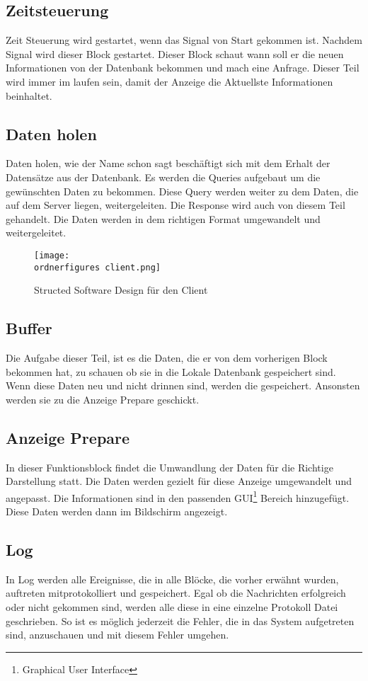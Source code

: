 \subsection{Zeitsteuerung}
Zeit Steuerung wird gestartet, wenn das Signal von Start gekommen ist. Nachdem Signal wird dieser Block gestartet. Dieser Block schaut wann soll er die neuen Informationen von der Datenbank bekommen und mach eine Anfrage. Dieser Teil wird immer im laufen sein, damit der Anzeige die Aktuellste Informationen beinhaltet.

\subsection{Daten holen}
Daten holen, wie der Name schon sagt beschäftigt sich mit dem Erhalt der Datensätze aus der Datenbank. Es werden die Queries aufgebaut um die gewünschten Daten zu bekommen. Diese Query werden weiter zu dem Daten, die auf dem Server liegen, weitergeleiten. Die Response wird auch von diesem Teil gehandelt. Die Daten werden in dem richtigen Format umgewandelt und weitergeleitet.

\begin{figure}[H]
	\centering
	\texttt{[image: \\ordnerfigures client.png]}
	\caption{Structed Software Design für den Client}
	\label{fi:structed_design_client}
\end{figure}

\subsection{Buffer}
Die Aufgabe dieser Teil, ist es die Daten, die er von dem vorherigen Block bekommen hat, zu schauen ob sie in die Lokale Datenbank gespeichert sind. Wenn diese Daten neu und nicht drinnen sind, werden die gespeichert. Ansonsten werden sie zu die Anzeige Prepare geschickt.

\subsection{Anzeige Prepare}
In dieser Funktionsblock findet die Umwandlung der Daten für die Richtige Darstellung statt. Die Daten werden gezielt für diese Anzeige umgewandelt und angepasst. Die Informationen sind in den passenden GUI\footnote{Graphical User Interface} Bereich hinzugefügt. Diese Daten werden dann im Bildschirm angezeigt.

\subsection{Log}
In Log werden alle Ereignisse, die in alle Blöcke, die vorher erwähnt wurden, auftreten mitprotokolliert und gespeichert.  Egal ob die Nachrichten erfolgreich oder nicht gekommen sind, werden alle diese in eine einzelne Protokoll Datei geschrieben. So ist es möglich jederzeit die Fehler, die in das System aufgetreten sind, anzuschauen und mit diesem Fehler umgehen.

